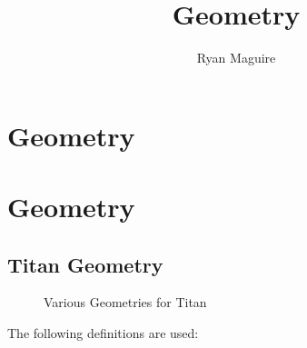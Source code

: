 \documentclass[crop=false,class=book,oneside]{standalone}
\begin{document}
    \ifx\ifplanetdiff\undefined
        \title{Geometry}
        \author{Ryan Maguire}
        \date{\vspace{-5ex}}
        \maketitle
        \tableofcontents
        \clearpage
        \chapter{Geometry}
        \setcounter{chapter}{2}
    \else
        \chapter{Geometry}
    \fi
    \section{Titan Geometry}
        \begin{figure}[H]
        	\centering
        	\captionsetup{type=figure}
        	\begin{subfigure}[b]{0.49\textwidth}
        	    \centering
        	    \captionsetup{type=figure}
        	    \label{fig:math_titan_geom_vec}
            \end{subfigure}
            \begin{subfigure}[b]{0.49\textwidth}
                \centering
                \captionsetup{type=figure}
                \label{fig:math_geo_bending_angle}
            \end{subfigure}
            \caption{Various Geometries for Titan}
        \end{figure}
        The following definitions are used:
\end{document}
